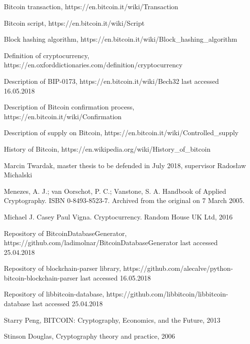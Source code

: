 \documentclass[12pt, en, eng, oneside, final]{mgr}
\begin{document}
\begin{thebibliography}{9}

Bitcoin transaction, https://en.bitcoin.it/wiki/Transaction

Bitcoin script, https://en.bitcoin.it/wiki/Script
 
Block hashing algorithm, https://en.bitcoin.it/wiki/Block\_hashing\_algorithm

Definition of cryptocurrency, https://en.oxforddictionaries.com/definition/cryptocurrency

Description of BIP-0173, https://en.bitcoin.it/wiki/Bech32 last accessed 16.05.2018

Description of Bitcoin confirmation process, https://en.bitcoin.it/wiki/Confirmation

Description of supply on Bitcoin, https://en.bitcoin.it/wiki/Controlled\_supply

History of Bitcoin, https://en.wikipedia.org/wiki/History\_of\_bitcoin

Marcin Twardak, master thesis to be defended in July 2018, supervisor Radosław Michalski

Menezes, A. J.; van Oorschot, P. C.; Vanstone, S. A. Handbook of Applied Cryptography. ISBN 0-8493-8523-7. Archived from the original on 7 March 2005.

Michael J. Casey Paul Vigna. Cryptocurrency. Random House UK Ltd, 2016

Repository of BitcoinDatabaseGenerator, 
\newline
https://github.com/ladimolnar/BitcoinDatabaseGenerator last accessed 25.04.2018

Repository of blockchain-parser library, https://github.com/alecalve/python-bitcoin-blockchain-parser last accessed 16.05.2018 

Repository of libbitcoin-database, https://github.com/libbitcoin/libbitcoin-database last accessed 25.04.2018

Starry Peng, BITCOIN: Cryptography, Economics, and the Future, 2013

Stinson Douglas, Cryptography theory and practice, 2006

\end{thebibliography}
\end{document}
